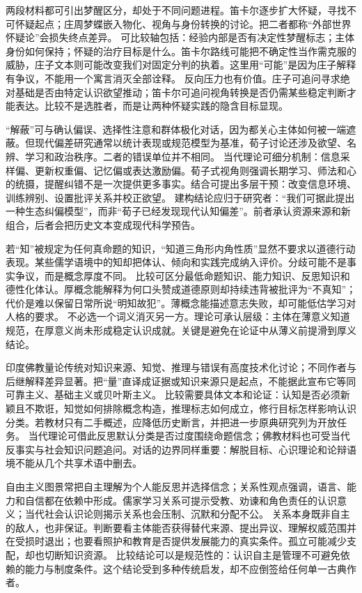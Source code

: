 两段材料都可引出梦醒区分，却处于不同问题进程。笛卡尔逐步扩大怀疑，寻找不可怀疑起点；庄周梦蝶嵌入物化、视角与身份转换的讨论\parencite{descartes1996,zhuangzi2009}。把二者都称“外部世界怀疑论”会损失终点差异。 可比较轴包括：经验内部是否有决定性梦醒标志；主体身份如何保持；怀疑的治疗目标是什么。笛卡尔路线可能把不确定性当作需克服的威胁，庄子文本则可能改变我们对固定分判的执着。这里用“可能”是因为庄子解释有争议，不能用一个寓言消灭全部诠释。 反向压力也有价值。庄子可追问寻求绝对基础是否由特定认识欲望推动；笛卡尔可追问视角转换是否仍需某些稳定判断才能表达。比较不是选胜者，而是让两种怀疑实践的隐含目标显现。

“解蔽”可与确认偏误、选择性注意和群体极化对话，因为都关心主体如何被一端遮蔽\parencite{xunzi2014}。但现代偏差研究通常以统计表现或规范模型为基准，荀子讨论还涉及欲望、名辨、学习和政治秩序。二者的错误单位并不相同。 当代理论可细分机制：信息采样偏、更新权重偏、记忆偏或表达激励偏。荀子式视角则强调长期学习、师法和心的统摄，提醒纠错不是一次提供更多事实。结合可提出多层干预：改变信息环境、训练辨别、设置批评关系并校正欲望。 建构结论应归于研究者：“我们可据此提出一种生态纠偏模型”，而非“荀子已经发现现代认知偏差”。前者承认资源来源和新组合，后者会把历史文本变成现代科学预告。

若“知”被规定为任何真命题的知识，“知道三角形内角性质”显然不要求以道德行动表现。某些儒学语境中的知却把体认、倾向和实践完成纳入评价\parencite{tiwald2014}。分歧可能不是事实争议，而是概念厚度不同。 比较可区分最低命题知识、能力知识、反思知识和德性化体认。厚概念能解释为何口头赞成道德原则却持续违背被批评为“不真知”；代价是难以保留日常所说“明知故犯”。薄概念能描述意志失败，却可能低估学习对人格的要求。 不必选一个词义消灭另一方。理论可承认层级：主体在薄意义知道规范，在厚意义尚未形成稳定认识成就。关键是避免在论证中从薄义前提滑到厚义结论。

印度佛教量论传统对知识来源、知觉、推理与错误有高度技术化讨论；不同作者与后继解释差异显著\parencite{dunne2004}。把“量”直译成证据或知识来源只是起点，不能据此宣布它等同可靠主义、基础主义或贝叶斯主义。 比较需要具体文本和论证：认知是否必须新颖且不欺诳，知觉如何排除概念构造，推理标志如何成立，修行目标怎样影响认识分类。若教材只有二手概述，应降低历史断言，并把进一步原典研究列为开放任务。 当代理论可借此反思默认分类是否过度围绕命题信念；佛教材料也可受当代反事实与社会知识问题追问。对话的边界同样重要：解脱目标、心识理论和论辩语境不能从几个共享术语中删去。

自由主义图景常把自主理解为个人能反思并选择信念；关系性观点强调，语言、能力和自信都在依赖中形成。儒家学习关系可提示受教、劝谏和角色责任的认识意义；当代社会认识论则揭示关系也会压制、沉默和分配不公。 关系本身既非自主的敌人，也非保证。判断要看主体能否获得替代来源、提出异议、理解权威范围并在受损时退出；也要看照护和教育是否提供发展能力的真实条件。孤立可能减少支配，却也切断知识资源。 比较结论可以是规范性的：认识自主是管理不可避免依赖的能力与制度条件。这个结论受到多种传统启发，却不应倒签给任何单一古典作者。

